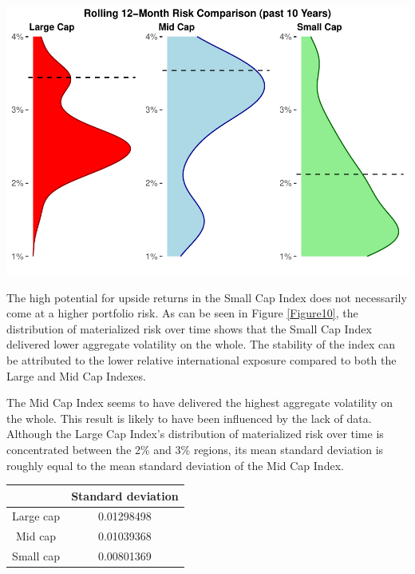 \documentclass[11pt,preprint, authoryear]{elsarticle}
\let\origfigure\figure
\let\endorigfigure\endfigure
\renewenvironment{figure}[1][2] {
    \expandafter\origfigure\expandafter[H]
} {
    \endorigfigure
}
\let\origtable\table
\let\endorigtable\endtable
\renewenvironment{table}[1][2] {
    \expandafter\origtable\expandafter[H]
} {
    \endorigtable
}
\numberwithin{equation}{section}
\numberwithin{figure}{section}
\numberwithin{table}{section}
\begin{document}
\begin{figure}[H]

{\centering \includegraphics{Volatility-of-Shares_files/figure-latex/Figure10-1} 

}

\caption{Rolling 12-month Risk Comparison (past 10 Years) \label{Figure10}}\label{fig:Figure10}
\end{figure}

The high potential for upside returns in the Small Cap Index does not
necessarily come at a higher portfolio risk. As can be seen in Figure
\ref{Figure10}, the distribution of materialized risk over time shows
that the Small Cap Index delivered lower aggregate volatility on the
whole. The stability of the index can be attributed to the lower
relative international exposure compared to both the Large and Mid Cap
Indexes.

The Mid Cap Index seems to have delivered the highest aggregate
volatility on the whole. This result is likely to have been influenced
by the lack of data. Although the Large Cap Index's distribution of
materialized risk over time is concentrated between the 2\% and 3\%
regions, its mean standard deviation is roughly equal to the mean
standard deviation of the Mid Cap Index.

\begin{table}[h]
\begin{center}
    \begin{tabular}{| c | c |}
    \hline
         & Standard deviation \\
        \hline
        Large cap & 0.01298498 \\
        Mid cap & 0.01039368 \\
        Small cap & 0.00801369 \\
        \hline
    \end{tabular}
    \caption{Standard deviation}
    \label{tab:SD}
\end{center}
\end{table}
\end{document}
